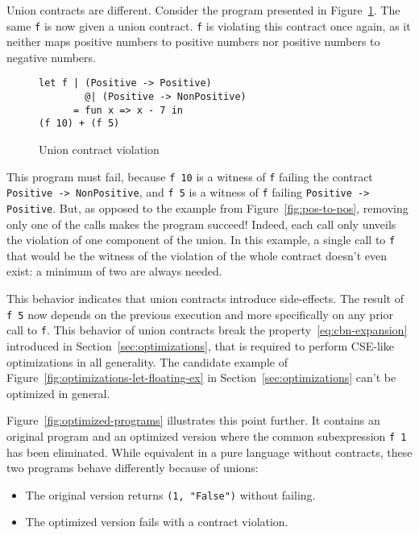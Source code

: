 \documentclass[sigplan,10pt,review,anonymous]{acmart}
\newcommand{\nickel}[1]{\lstinline[language=nickel]{#1}}
\begin{document}
Union contracts are different. Consider the program presented in
Figure~\ref{fig:wrong-union-function}. The same \nickel{f} is now given a union
contract. \nickel{f} is violating this contract once again, as it neither maps
positive numbers to positive numbers nor positive numbers to negative numbers.

\begin{figure}[h]
\begin{lstlisting}[language=nickel]
let f | (Positive -> Positive)
        @| (Positive -> NonPositive)
      = fun x => x - 7 in
(f 10) + (f 5)
\end{lstlisting}
\caption{Union contract violation}
\label{fig:wrong-union-function}
\end{figure}

This program must fail, because \nickel{f 10} is a witness of \nickel{f} failing
the contract \nickel{Positive -> NonPositive}, and \nickel{f 5} is a witness of
\nickel{f} failing \nickel{Positive -> Positive}.  But, as opposed to the
example from Figure~\ref{fig:pos-to-pos}, removing only one of the calls makes the
program succeed! Indeed, each call only unveils the violation of one component
of the union. In this example, a single call to \nickel{f} that would be the
witness of the violation of the whole contract doesn't even exist: a minimum of
two are always needed.

This behavior indicates that union contracts introduce side-effects. The result
of \nickel{f 5} now depends on the previous execution and more specifically on
any prior call to \nickel{f}. This behavior of union contracts break the
property~\ref{eq:cbn-expansion} introduced in Section~\ref{sec:optimizations},
that is required to perform CSE-like optimizations in all generality. The
candidate example of Figure~\ref{fig:optimizations-let-floating-ex} in
Section~\ref{sec:optimizations} can't be optimized in general.

Figure~\ref{fig:optimized-programs} illustrates this point further. It contains
an original program and an optimized version where the common subexpression
\nickel{f 1} has been eliminated. While equivalent in a pure language without
contracts, these two programs behave differently because of unions:

\begin{itemize}
    \item The original version returns \nickel{(1, "False")} without failing.
    \item The optimized version fails with a contract violation.
\end{itemize}
\end{document}
